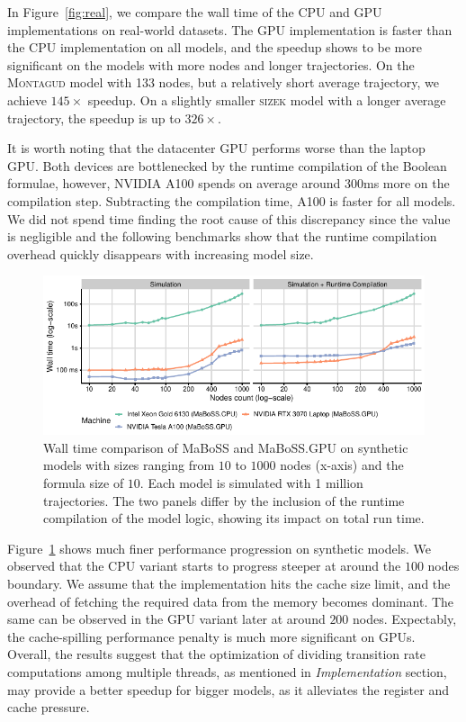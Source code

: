 \documentclass[sn-mathphys-num]{sn-jnl}%
\begin{document}
In Figure~\ref{fig:real}, we compare the wall time of the CPU and GPU implementations on real-world datasets. The GPU implementation is faster than the CPU implementation on all models, and the speedup shows to be more significant on the models with more nodes and longer trajectories. On the \textsc{Montagud} model with 133 nodes, but a relatively short average trajectory, we achieve $145\times$ speedup. On a slightly smaller \textsc{sizek} model with a longer average trajectory, the speedup is up to $326\times$. 

It is worth noting that the datacenter GPU performs worse than the laptop GPU. Both devices are bottlenecked by the runtime compilation of the Boolean formulae, however, NVIDIA A100 spends on average around $300$ms more on the compilation step. Subtracting the compilation time, A100 is faster for all models. We did not spend time finding the root cause of this discrepancy since the value is negligible and the following benchmarks show that the runtime compilation overhead quickly disappears with increasing model size.

\begin{figure}
    \centering
    \includegraphics[width=\linewidth]{plots/nodes.pdf}
    \caption{Wall time comparison of MaBoSS and MaBoSS.GPU on synthetic models with sizes ranging from $10$ to $1000$ nodes (x-axis) and the formula size of $10$. Each model is simulated with 1 million trajectories. The two panels differ by the inclusion of the runtime compilation of the model logic, showing its impact on total run time.}
    \label{fig:synth}
\end{figure}

Figure~\ref{fig:synth} shows much finer performance progression on synthetic models. We observed that the CPU variant starts to progress steeper at around the $100$ nodes boundary. We assume that the implementation hits the cache size limit, and the overhead of fetching the required data from the memory becomes dominant. The same can be observed in the GPU variant later at around $200$ nodes. Expectably, the cache-spilling performance penalty is much more significant on GPUs. Overall, the results suggest that the optimization of dividing transition rate computations among multiple threads, as mentioned in \emph{Implementation} section, may provide a better speedup for bigger models, as it alleviates the register and cache pressure.
\end{document}
